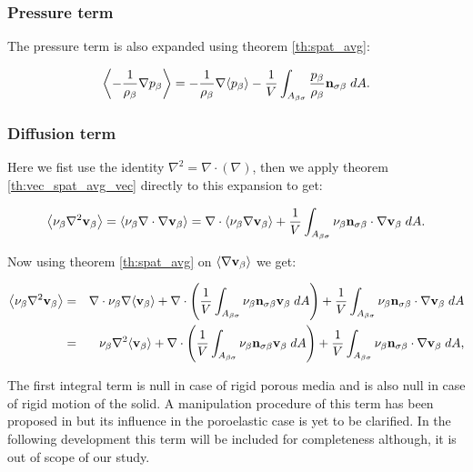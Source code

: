 \subsubsection{Pressure term}
The pressure term is also expanded using theorem \eqref{th:spat_avg}:

\begin{equation}
{\left< -\dfrac{1}{\rho_{\beta}} \nabla p_{\beta}\right>} = -\dfrac{1}{\rho_{\beta}} \nabla {\left< p_{\beta}\right>} -\dfrac{1}{V} \int_{A_{\beta \sigma}}  \dfrac{p_{\beta}}{\rho_{\beta}} \mathbf{n}_{\sigma \beta} \;dA.
\end{equation}

\subsubsection{Diffusion term}
Here we fist use the identity $\nabla^2 = \nabla \cdot (\nabla)$, then we apply theorem \eqref{th:vec_spat_avg_vec} directly to this expansion to get:

\begin{equation}
{\left< \nu_{\beta}\nabla^2 \textbf{v}_{\beta}\right>} = {\left< \nu_{\beta}\nabla \cdot \nabla \textbf{v}_{\beta} \right>} = \nabla \cdot {\left< \nu_{\beta}\nabla \textbf{v}_{\beta}\right>} +\dfrac{1}{V} \int_{A_{\beta \sigma}}  \nu_{\beta}   \mathbf{n}_{\sigma \beta} \cdot \nabla \textbf{v}_{\beta} \;dA.
\label{eq:4_1}
\end{equation}

\noindent Now using theorem \eqref{th:spat_avg} on ${\left< \nabla \textbf{v}_{\beta} \right>}$ we get:

\begin{eqnarray}
	{\left< \nu_{\beta}\nabla^2 \textbf{v}_{\beta}\right>} &=& \nabla \cdot \nu_{\beta} \nabla {\left< \textbf{v}_{\beta}\right>} + \nabla \cdot \left( \dfrac{1}{V} \int_{A_{\beta \sigma}}  \nu_{\beta} \mathbf{n}_{\sigma \beta} \textbf{v}_{\beta}  \;dA \right) + \dfrac{1}{V} \int_{A_{\beta \sigma}}  \nu_{\beta}   \mathbf{n}_{\sigma \beta} \cdot \nabla \textbf{v}_{\beta} \;dA  \nonumber \\
	&=& \nu_{\beta}\nabla^2 {\left< \textbf{v}_{\beta} \right>} +  \nabla \cdot \left( \dfrac{1}{V} \int_{A_{\beta \sigma}}  \nu_{\beta} \mathbf{n}_{\sigma \beta} \textbf{v}_{\beta}  \;dA \right) + \dfrac{1}{V} \int_{A_{\beta \sigma}}  \nu_{\beta}   \mathbf{n}_{\sigma \beta} \cdot \nabla \textbf{v}_{\beta} \;dA,   \nonumber
\end{eqnarray}


\noindent The first integral term is null in case of rigid porous media and is also null in case of rigid motion of the solid. A manipulation procedure of this term has been proposed in \citet{hussong2011continuum} but its influence in the poroelastic case is yet to be clarified. In the following development this term will be included for completeness although, it is out of scope of our study.

